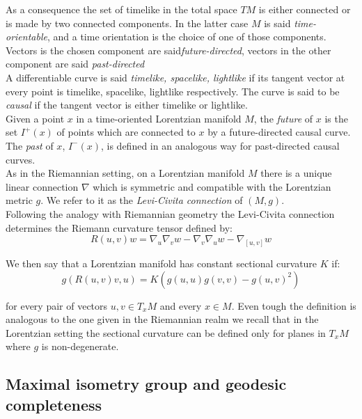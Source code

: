 As a consequence the set of timelike in the total space $TM$ is either connected or is made by two connected components. In the latter case $M$ is said \textit{time-orientable}, and a time orientation is the choice of one of those components. Vectors is the chosen component are said\textit{future-directed}, vectors in the other component are said \textit{past-directed}\\
A differentiable curve is said \textit{timelike, spacelike, lightlike} if its tangent vector at every point is timelike, spacelike, lightlike respectively. The curve is said to be \textit{causal} if the tangent vector is either timelike or lightlike. \\ Given a point $x$ in a time-oriented Lorentzian manifold $M$, the \textit{future} of $x$ is the set $I^+(x)$ of points which are connected to $x$ by a future-directed causal curve. The \textit{past} of $x$, $I^-(x)$, is defined in an analogous way for past-directed causal curves. \\As in the Riemannian setting, on a Lorentzian manifold $M$ there is a unique linear connection $\nabla$ which is symmetric and compatible with the Lorentzian metric $g$. We refer to it as the \textit{Levi-Civita connection} of $(M,g)$.\\ Following the analogy with Riemannian geometry the Levi-Civita connection determines the Riemann curvature tensor defined by: 
\[
    R(u,v)w=\nabla_u\nabla_v w-\nabla_v\nabla_u w-\nabla_{[u,v]}w
\]  

We then say that a Lorentzian manifold has constant sectional curvature $K$ if: 
\begin{equation}\label{sectionalcurvature}
    g(R(u,v)v,u)=K(g(u,u)g(v,v)-g(u,v)^2) 
\end{equation}
    


for every pair of vectors $u,v \in T_{x}M$ and every $x\in M$. Even tough the definition is analogous to the one given in the Riemannian realm we recall that in the Lorentzian setting the sectional curvature can be defined only for planes in $T_{x}M$ where $g$ is non-degenerate. 

\subsection{Maximal isometry group and geodesic completeness} 


